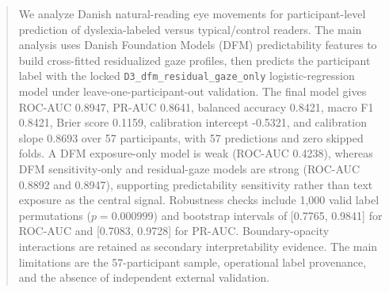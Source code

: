 \begin{abstract}
We analyze Danish natural-reading eye movements for participant-level prediction of
dyslexia-labeled versus typical/control readers. The main analysis uses Danish
Foundation Models (DFM) predictability features to build cross-fitted residualized
gaze profiles, then predicts the participant label with the
locked \texttt{D3\_dfm\_residual\_gaze\_only} logistic-regression model under
leave-one-participant-out validation. The final model gives ROC-AUC 0.8947, PR-AUC 0.8641, balanced accuracy 0.8421, macro F1 0.8421, Brier score 0.1159, calibration intercept -0.5321, and calibration slope 0.8693 over 57
participants, with 57 predictions and zero skipped folds. A DFM exposure-only model is
weak (ROC-AUC 0.4238), whereas DFM sensitivity-only and residual-gaze models are strong
(ROC-AUC 0.8892 and 0.8947), supporting predictability sensitivity rather than text
exposure as the central signal. Robustness checks include 1,000 valid label
permutations ($p=0.000999$) and bootstrap intervals of [0.7765, 0.9841] for ROC-AUC and
[0.7083, 0.9728] for PR-AUC. Boundary-opacity interactions are retained as secondary
interpretability evidence. The main limitations are the 57-participant sample,
operational label provenance, and the absence of independent external validation.
\end{abstract}
